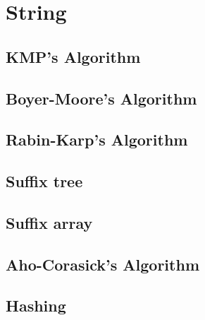 \chapter{String}
	\section{KMP's Algorithm}
	\section{Boyer-Moore's Algorithm}
	\section{Rabin-Karp's Algorithm}
	\section{Suffix tree}
	\section{Suffix array}
	\section{Aho-Corasick's Algorithm}
	\section{Hashing}
